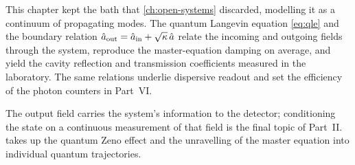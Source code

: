 This chapter kept the bath that \cref{ch:open-systems} discarded,
modelling it as a continuum of propagating modes. The quantum
Langevin equation \cref{eq:qle} and the boundary relation
$\hat a_{\rm out}=\hat a_{\rm in}+\sqrt{\kappa}\,\hat a$ relate the
incoming and outgoing fields through the system, reproduce the
master-equation damping on average, and yield the cavity reflection
and transmission coefficients measured in the laboratory. The same
relations underlie dispersive readout and set the efficiency of the
photon counters in Part~VI.

The output field carries the system's information to the detector;
conditioning the state on a continuous measurement of that field is
the final topic of Part~II.  takes
up the quantum Zeno effect and the unravelling of the master
equation into individual quantum trajectories.

